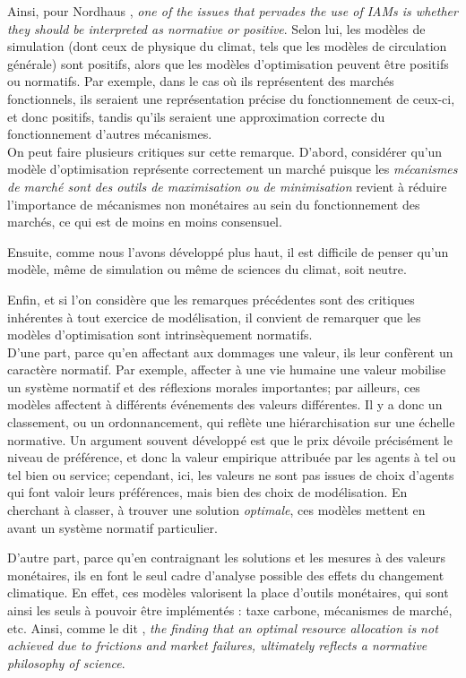 Ainsi, pour Nordhaus \textcite{nordhaus_dice_2013}, \emph{one of the issues that pervades the use of IAMs is whether they should be interpreted as normative or positive}. Selon lui, les modèles de simulation (dont ceux de physique du climat, tels que les modèles de circulation générale) sont positifs, alors que les modèles d'optimisation peuvent être positifs ou normatifs. Par exemple, dans le cas où ils représentent des marchés fonctionnels, ils seraient une représentation précise du fonctionnement de ceux-ci, et donc positifs, tandis qu'ils seraient une approximation correcte du fonctionnement d'autres mécanismes. \\

On peut faire plusieurs critiques sur cette remarque. D'abord, considérer qu'un modèle d'optimisation représente correctement un marché puisque les \emph{mécanismes de marché sont des outils de maximisation ou de minimisation} revient à réduire l'importance de mécanismes non monétaires au sein du fonctionnement des marchés, ce qui est de moins en moins consensuel. 

Ensuite, comme nous l'avons développé plus haut, il est difficile de penser qu'un modèle, même de simulation ou même de sciences du climat, soit neutre. 

Enfin, et si l'on considère que les remarques précédentes sont des critiques inhérentes à tout exercice de modélisation, il convient de remarquer que les modèles d'optimisation sont intrinsèquement normatifs. \\

D'une part, parce qu'en affectant aux dommages une valeur, ils leur confèrent un caractère normatif. Par exemple, affecter à une vie humaine une valeur mobilise un système normatif et des réflexions morales importantes; par ailleurs, ces modèles affectent à différents événements des valeurs différentes. Il y a donc un classement, ou un ordonnancement, qui reflète une hiérarchisation sur une échelle normative. Un argument souvent développé est que le prix dévoile précisément le niveau de préférence, et donc la valeur empirique attribuée par les agents à tel ou tel bien ou service; cependant, ici, les valeurs ne sont pas issues de choix d'agents qui font valoir leurs préférences, mais bien des choix de modélisation. En cherchant à classer, à trouver une solution \emph{optimale}, ces modèles mettent en avant un système normatif particulier. 

D'autre part, parce qu'en contraignant les solutions et les mesures à des valeurs monétaires, ils en font le seul cadre d'analyse possible des effets du changement climatique. En effet, ces modèles valorisent la place d'outils monétaires, qui sont ainsi les seuls à pouvoir être implémentés : taxe carbone, mécanismes de marché, etc. Ainsi, comme le dit \textcite{mercure_modelling_2019}, \emph{the finding that an optimal resource allocation is not achieved due to frictions and market failures, ultimately reflects a normative philosophy of science}. 

